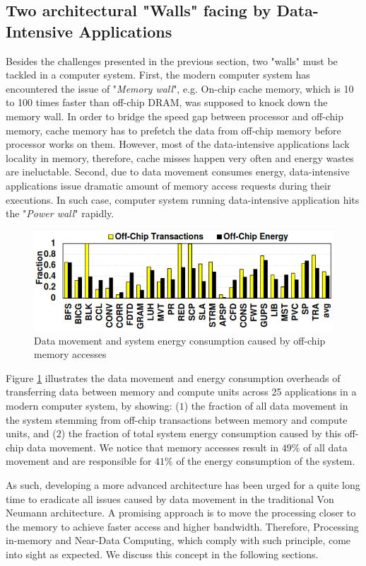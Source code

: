 \documentclass[letterpaper, 11pt, conference, margin=1in]{ieeeconf}   %
\begin{document}
\subsection{\bf Two architectural "Walls" facing by Data-Intensive Applications}
Besides the challenges presented in the previous section, two "walls" must be tackled in a computer system. First, the modern computer system has encountered the issue of "\textit{Memory wall}", e.g. On-chip cache memory, which is 10 to 100 times faster than off-chip DRAM, was supposed to knock down the memory wall. In order to bridge the speed gap between processor and off-chip memory, cache memory has to prefetch the data from off-chip memory before processor works on them. However, most of the data-intensive applications lack locality in memory, therefore, cache misses happen very often and energy wastes are ineluctable. Second, due to data movement consumes energy, data-intensive applications issue dramatic amount of memory access requests during their executions. In such case, computer system running data-intensive application hits the "\textit{Power wall}" rapidly.

\begin{figure}[ht]
  \centering
  \includegraphics[scale=0.43]{figures/energy_consumption.png}
  \caption{Data movement and system energy consumption caused by off-chip memory accesses}
  \label{fig:power-consumption}
\end{figure}

Figure \ref{fig:power-consumption} illustrates the data movement and energy consumption overheads of transferring data between memory and compute units across 25 applications in a modern computer system, by showing: ($1$) the fraction of all data movement in the system stemming from off-chip transactions between memory and compute units, and ($2$) the fraction of total system energy consumption caused by this off-chip data movement. We notice that memory accesses result in $49\%$ of all data movement and are responsible for $41\%$ of the energy consumption of the system.

As such, developing a more advanced architecture has been urged for a quite long time to eradicate all issues caused by data movement in the traditional Von Neumann architecture. A promising approach is to move the processing closer to the memory to achieve faster access and higher bandwidth. Therefore, Processing in-memory and Near-Data Computing, which comply with such principle, come into sight as expected. We discuss this concept in the following sections.
\end{document}
